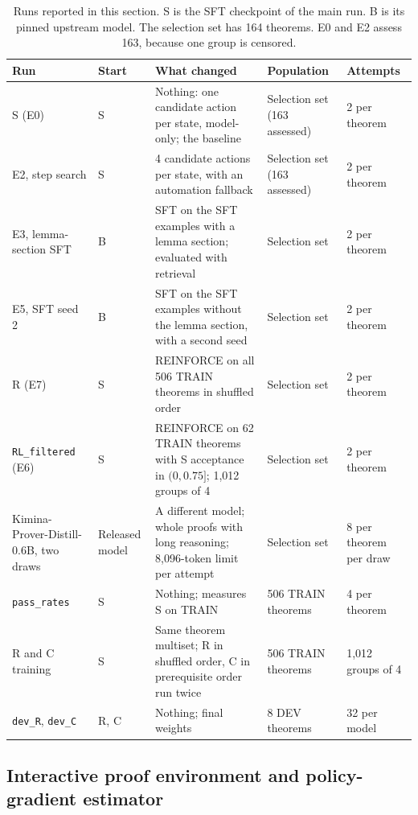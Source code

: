 \documentclass[11pt]{article}
\newcommand{\code}[1]{\texttt{#1}}
\begin{document}
\begin{table}[!htbp]
\centering
\small
\caption{Runs reported in this section. S is the SFT checkpoint of the main run. B is its pinned upstream model. The selection set has 164 theorems. E0 and E2 assess 163, because one group is censored.}
\label{tab:oct19-runs}
\smallskip
\begin{tabularx}{\textwidth}{@{}P{2.6cm}P{1.4cm}YP{2.6cm}P{2.1cm}@{}}
\toprule
Run & Start & What changed & Population & Attempts \\
\midrule
S (E0) & S & Nothing: one candidate action per state, model-only; the baseline & Selection set (163 assessed) & 2 per theorem \\
E2, step search & S & 4 candidate actions per state, with an automation fallback & Selection set (163 assessed) & 2 per theorem \\
E3, lemma-section SFT & B & SFT on the SFT examples with a lemma section; evaluated with retrieval & Selection set & 2 per theorem \\
E5, SFT seed 2 & B & SFT on the SFT examples without the lemma section, with a second seed & Selection set & 2 per theorem \\
R (E7) & S & REINFORCE on all 506 TRAIN theorems in shuffled order & Selection set & 2 per theorem \\
\code{RL\_filtered} (E6) & S & REINFORCE on 62 TRAIN theorems with S acceptance in $(0, 0.75]$; 1,012 groups of 4 & Selection set & 2 per theorem \\
Kimina-Prover-Distill-0.6B, two draws & Released model & A different model; whole proofs with long reasoning; 8,096-token limit per attempt & Selection set & 8 per theorem per draw \\
\code{pass\_rates} & S & Nothing; measures S on TRAIN & 506 TRAIN theorems & 4 per theorem \\
R and C training & S & Same theorem multiset; R in shuffled order, C in prerequisite order run twice & 506 TRAIN theorems & 1,012 groups of 4 \\
\code{dev\_R}, \code{dev\_C} & R, C & Nothing; final weights & 8 DEV theorems & 32 per model \\
\bottomrule
\end{tabularx}
\end{table}

\subsection{Interactive proof environment and policy-gradient estimator}
\label{sec:oct19-setup}
\end{document}
